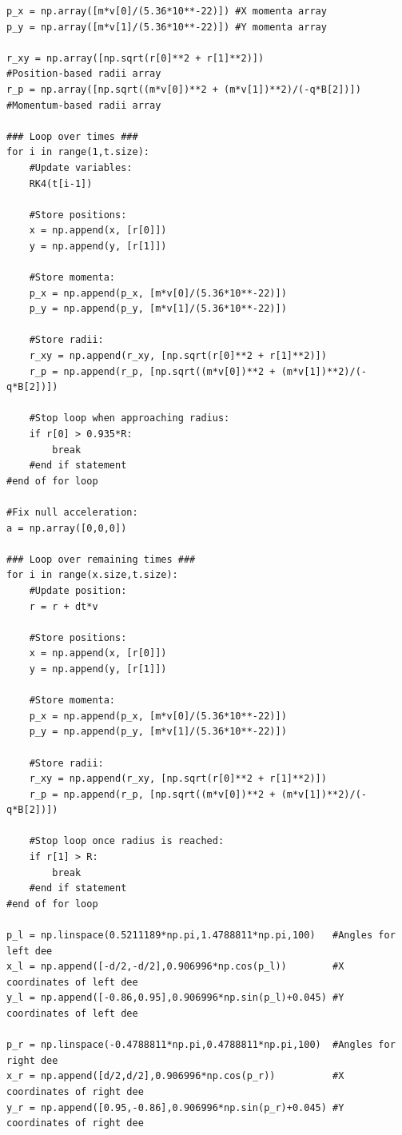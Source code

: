 \documentclass[letterpaper, 11pt]{article}
\begin{document}
\begin{lstlisting}
p_x = np.array([m*v[0]/(5.36*10**-22)]) #X momenta array
p_y = np.array([m*v[1]/(5.36*10**-22)]) #Y momenta array

r_xy = np.array([np.sqrt(r[0]**2 + r[1]**2)])                  #Position-based radii array
r_p = np.array([np.sqrt((m*v[0])**2 + (m*v[1])**2)/(-q*B[2])]) #Momentum-based radii array

### Loop over times ###
for i in range(1,t.size):
    #Update variables:
    RK4(t[i-1])
    
    #Store positions:
    x = np.append(x, [r[0]])
    y = np.append(y, [r[1]])
    
    #Store momenta:
    p_x = np.append(p_x, [m*v[0]/(5.36*10**-22)])
    p_y = np.append(p_y, [m*v[1]/(5.36*10**-22)])
    
    #Store radii:
    r_xy = np.append(r_xy, [np.sqrt(r[0]**2 + r[1]**2)])
    r_p = np.append(r_p, [np.sqrt((m*v[0])**2 + (m*v[1])**2)/(-q*B[2])])
    
    #Stop loop when approaching radius:
    if r[0] > 0.935*R:
        break
    #end if statement
#end of for loop

#Fix null acceleration:
a = np.array([0,0,0])

### Loop over remaining times ###   
for i in range(x.size,t.size):
    #Update position:
    r = r + dt*v
    
    #Store positions:
    x = np.append(x, [r[0]])
    y = np.append(y, [r[1]])
    
    #Store momenta:
    p_x = np.append(p_x, [m*v[0]/(5.36*10**-22)])
    p_y = np.append(p_y, [m*v[1]/(5.36*10**-22)])
    
    #Store radii:
    r_xy = np.append(r_xy, [np.sqrt(r[0]**2 + r[1]**2)])
    r_p = np.append(r_p, [np.sqrt((m*v[0])**2 + (m*v[1])**2)/(-q*B[2])])
    
    #Stop loop once radius is reached:
    if r[1] > R:
        break
    #end if statement
#end of for loop
   
p_l = np.linspace(0.5211189*np.pi,1.4788811*np.pi,100)   #Angles for left dee
x_l = np.append([-d/2,-d/2],0.906996*np.cos(p_l))        #X coordinates of left dee
y_l = np.append([-0.86,0.95],0.906996*np.sin(p_l)+0.045) #Y coordinates of left dee

p_r = np.linspace(-0.4788811*np.pi,0.4788811*np.pi,100)  #Angles for right dee
x_r = np.append([d/2,d/2],0.906996*np.cos(p_r))          #X coordinates of right dee
y_r = np.append([0.95,-0.86],0.906996*np.sin(p_r)+0.045) #Y coordinates of right dee


\end{lstlisting}
\end{document}
